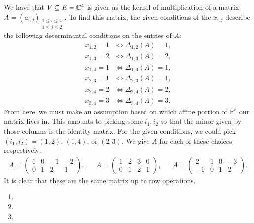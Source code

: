 \documentclass[letterpaper, 11pt, oneside]{book}
\begin{document}
\begin{sol}\label{ex:YT_9.1.2}
  We have that $V \subseteq E = \mathbb{C}^{4}$ is given as the kernel of multiplication of a matrix $A = (a_{i, j})_{\substack{1 \leq i \leq 4 \\ 1 \leq j \leq 2}}$.
  To find this matrix, the given conditions of the $x_{i, j}$ describe the following determinantal conditions on the entries of $A$:
  \begin{align*}
    x_{1, 2} = 1 &\iff \Delta_{1, 2}(A) = 1, \\
    x_{1, 3} = 2 &\iff \Delta_{1, 3}(A) = 2, \\
    x_{1, 4} = 1 &\iff \Delta_{1, 4}(A) = 1, \\
    x_{2, 3} = 1 &\iff \Delta_{2, 3}(A) = 1, \\
    x_{2, 4} = 2 &\iff \Delta_{2, 4}(A) = 2, \\
    x_{3, 4} = 3 &\iff \Delta_{3, 4}(A) = 3.
  \end{align*}
  From here, we must make an assumption based on which affine portion of $\mathbb{P}^{5}$ our matrix lives in.
  This amounts to picking some $i_{1}, i_{2}$ so that the minor given by those columns is the identity matrix.
  For the given conditions, we could pick $(i_{1}, i_{2}) = (1, 2)$, $(1, 4)$, or $(2, 3)$.
  We give $A$ for each of these choices respectively:
  \begin{align*}
    A =
    \begin{pmatrix}
      1 & 0 & -1 & -2 \\
      0 & 1 & 2 & 1
    \end{pmatrix},
    &&
    A =
    \begin{pmatrix}
      1 & 2 & 3 & 0 \\
      0 & 1 & 2 & 1
    \end{pmatrix},
    &&
    A =
    \begin{pmatrix}
      2 & 1 & 0 & -3 \\
      -1 & 0 & 1 & 2
    \end{pmatrix}.
  \end{align*}
  It is clear that these are the same matrix up to row operations.
\end{sol}

\begin{sol}\label{ex:YT_9.1.3}
  \begin{enumerate}[label=(\roman*)]
    \item
    \item
    \item
  \end{enumerate}
\end{sol}
\end{document}
